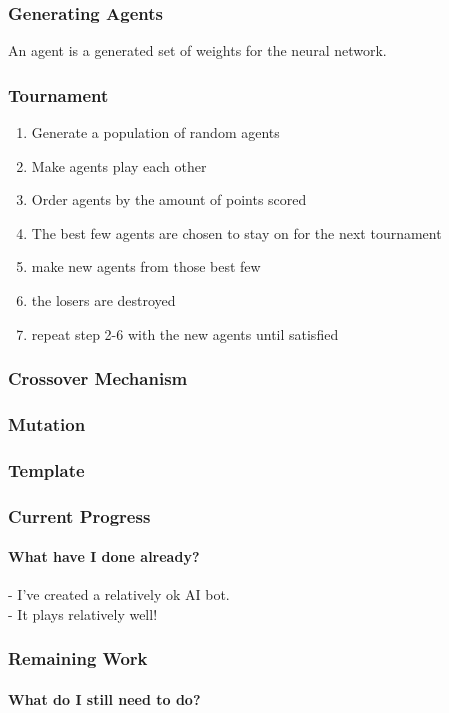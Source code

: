 \documentclass{beamer}
\begin{document}

\begin{frame}
	\frametitle{Generating Agents}
	An agent is a generated set of weights for the neural network.
\end{frame}

\begin{frame}
	\frametitle{Tournament}
	\begin{enumerate}
		\item Generate a population of random agents
		\item Make agents play each other
		\item Order agents by the amount of points scored
		\item The best few agents are chosen to stay on for the next tournament
		\item make new agents from those best few
		\item the losers are destroyed
		\item repeat step 2-6 with the new agents until satisfied
	\end{enumerate}
\end{frame}


\begin{frame}
	\frametitle{Crossover Mechanism}
\end{frame}

\begin{frame}
	\frametitle{Mutation}
\end{frame}

\begin{frame}
	\frametitle{Template}
\end{frame}

\begin{frame}
	\frametitle{Current Progress}
	\framesubtitle{What have I done already?}

	- I've created a relatively ok AI bot. \\
	- It plays relatively well! \\

\end{frame}

\begin{frame}
	\frametitle{Remaining Work}
	\framesubtitle{What do I still need to do?}
\end{frame}
\end{document}
